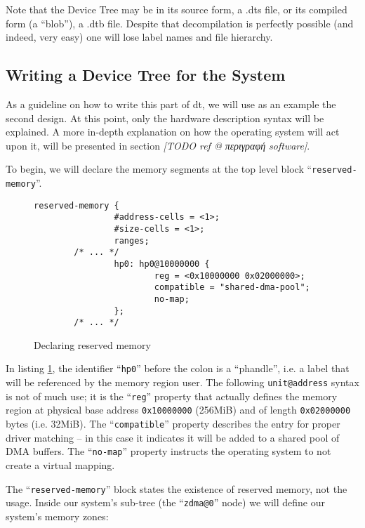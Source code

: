 Note that the Device Tree may be in its source form, 
a .dts file, or its compiled form (a ``blob''), a .dtb file.
Despite that decompilation is perfectly possible (and indeed, very easy)
one will lose label names and file hierarchy.

\subsection{Writing a Device Tree for the System}
\label{sec:dt}

As a guideline on how to write this part of \gls{dt}, we will use as an example the second design.
At this point, only the hardware description syntax will be explained.
A more in-depth explanation on how the operating system will act upon it,
will be presented in section \emph{[TODO ref @ περιγραφή software]}.

To begin, we will declare the memory segments at the top level block ``\texttt{reserved-memory}''.

\begin{figure}[ht!]
\centering
\begin{lstlisting}[style=basic]
        reserved-memory {
                #address-cells = <1>;
                #size-cells = <1>;
                ranges;
		/* ... */
                hp0: hp0@10000000 {
                        reg = <0x10000000 0x02000000>;
                        compatible = "shared-dma-pool";
                        no-map;
                };
		/* ... */
\end{lstlisting}
\caption{Declaring reserved memory}
\label{lst:resmem}
\end{figure}

In listing \ref{lst:resmem}, the identifier ``\texttt{hp0}'' before the colon is a ``phandle'', 
i.e. a label that will be referenced by
the memory region user. The following \texttt{unit@address} syntax is not of much use;
it is the ``\texttt{reg}'' property that actually defines the memory region 
at physical base address \texttt{0x10000000} (256MiB) and of length \texttt{0x02000000} bytes (i.e. 32MiB).
The ``\texttt{compatible}'' property describes the entry for proper driver matching --
in this case it indicates it will be added to a shared pool of DMA buffers.
The ``\texttt{no-map}'' property instructs the operating system to not create a virtual mapping.

The ``\texttt{reserved-memory}'' block states the existence of reserved memory, not the usage.
Inside our system's sub-tree (the ``\texttt{zdma@0}'' node) we will define our system's memory zones:

